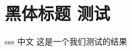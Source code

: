 \documentclass[report]{../../custom}
\begin{document}
\maketitle

\section{黑体标题 测试}
sss 中文 这是一个我们测试的结果
\end{document}
